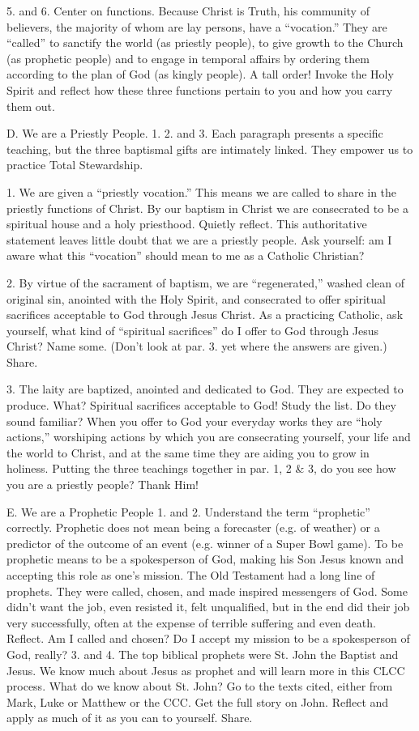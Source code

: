 \documentclass[oneside]{book}
\begin{document}
5. and 6. Center on functions. Because Christ is Truth, his community of
believers, the majority of whom are lay persons, have a ``vocation.'' They are
``called'' to sanctify the world (as priestly people), to give growth to the
Church (as prophetic people) and to engage in temporal affairs by ordering them
according to the plan of God (as kingly people). A tall order! Invoke the Holy
Spirit and reflect how these three functions pertain to you and how you carry
them out.

D. We are a Priestly People.
1. 2. and 3. Each paragraph presents a specific teaching, but the three
baptismal gifts are intimately linked. They empower us to practice Total
Stewardship.

1. We are given a ``priestly vocation.'' This means we are called to share in
the priestly functions of Christ. By our baptism in Christ we are consecrated to
be a spiritual house and a holy priesthood. Quietly reflect. This authoritative
statement leaves little doubt that we are a priestly people. Ask yourself: am I
aware what this ``vocation'' should mean to me as a Catholic Christian?

2. By virtue of the sacrament of baptism, we are ``regenerated,'' washed clean
of original sin, anointed with the Holy Spirit, and consecrated to offer
spiritual sacrifices acceptable to God through Jesus Christ. As a practicing
Catholic, ask yourself, what kind of ``spiritual sacrifices'' do I offer to God
through Jesus Christ? Name some. (Don't look at par. 3. yet where the answers
are given.) Share.

3. The laity are baptized, anointed and dedicated to God. They are expected to
produce. What? Spiritual sacrifices acceptable to God! Study the list. Do they
sound familiar? When you offer to God your everyday works they are ``holy
actions,'' worshiping actions by which you are consecrating yourself, your life
and the world to Christ, and at the same time they are aiding you to grow in
holiness. Putting the three teachings together in par. 1, 2 \& 3, do you see how
you are a priestly people? Thank Him!

E. We are a Prophetic People
1. and 2. Understand the term ``prophetic'' correctly. Prophetic does not mean
being a forecaster (e.g. of weather) or a predictor of the outcome of an event
(e.g. winner of a Super Bowl game). To be prophetic means to be a spokesperson
of God, making his Son Jesus known and accepting this role as one's mission. The
Old Testament had a long line of prophets. They were called, chosen, and made
inspired messengers of God. Some didn't want the job, even resisted it, felt
unqualified, but in the end did their job very successfully, often at the
expense of terrible suffering and even death. Reflect. Am I called and chosen?
Do I accept my mission to be a spokesperson of God, really?
3. and 4. The top biblical prophets were St. John the Baptist and Jesus. We know
much about Jesus as prophet and will learn more in this CLCC process. What do we
know about St. John? Go to the texts cited, either from Mark, Luke or Matthew or
the CCC. Get the full story on John. Reflect and apply as much of it as you can
to yourself. Share.
\end{document}
